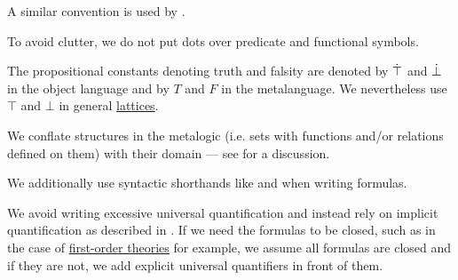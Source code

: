 \begin{remark}
\begin{thmenum}
    A similar convention is used by .

    To avoid clutter, we do not put dots over predicate and functional symbols.

     The propositional constants denoting truth and falsity are denoted by \( \dot\top \) and \( \dot\bot \) in the object language and by \( T \) and \( F \) in the metalanguage. We nevertheless use \( \top \) and \( \bot \) in general \hyperref[def:lattice]{lattices}.

     We conflate structures in the metalogic (i.e. sets with functions and/or relations defined on them) with their domain --- see  for a discussion.

     We additionally use syntactic shorthands like  and  when writing formulas.

     We avoid writing excessive universal quantification and instead rely on implicit quantification as described in . If we need the formulas to be closed, such as in the case of \hyperref[def:first_order_theory]{first-order theories} for example, we assume all formulas are closed and if they are not, we add explicit universal quantifiers in front of them.
  \end{thmenum}
\end{remark}

